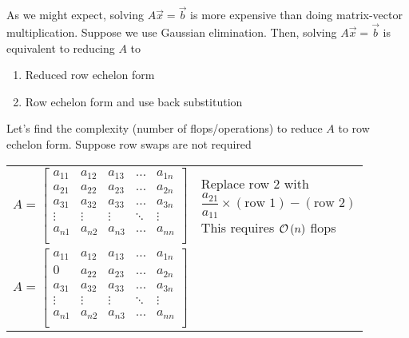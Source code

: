 As we might expect, 
solving $A\Vec{x} = \Vec{b}$ is more expensive than doing matrix-vector multiplication. 
Suppose we use Gaussian elimination. 
Then, solving $A\Vec{x}=\Vec{b}$ is equivalent to reducing $A$ to 
%
\begin{enumerate}
    \item Reduced row echelon form
    \item Row echelon form and use back substitution
\end{enumerate}
%
Let's find the complexity (number of flops/operations) 
to reduce $A$ to row echelon form. 
Suppose row swaps are not required
%
\begin{center}
    \begin{tabular}{p{6cm}p{6cm}}
\begin{equation*}
    A = 
    \begin{bmatrix}  
        a_{11} & a_{12} & a_{13} & \ldots & a_{1n} \\
        a_{21} & a_{22} & a_{23} & \ldots & a_{2n} \\
        a_{31} & a_{32} & a_{33} & \ldots & a_{3n} \\
        \vdots & \vdots & \vdots & \ddots & \vdots \\
        a_{n1} & a_{n2} & a_{n3} & \ldots & a_{nn} \\
    \end{bmatrix}  
\end{equation*} 
               & 
        \vspace{1em}
Replace row 2 with
\begin{equation*}
    \frac{a_{21}}{a_{11}} \times (\text{row 1}) - (\text{row 2})
\end{equation*}
        This requires $\mathcal{O}\left(n\right)$ flops             \\
\begin{equation*}
    A = 
    \begin{bmatrix}  
        a_{11} & a_{12} & a_{13} & \ldots & a_{1n} \\
        0      & a_{22} & a_{23} & \ldots & a_{2n} \\
        a_{31} & a_{32} & a_{33} & \ldots & a_{3n} \\
        \vdots & \vdots & \vdots & \ddots & \vdots \\
        a_{n1} & a_{n2} & a_{n3} & \ldots & a_{nn} \\
    \end{bmatrix}  
\end{equation*}
               & 

\end{tabular}
\end{center}
